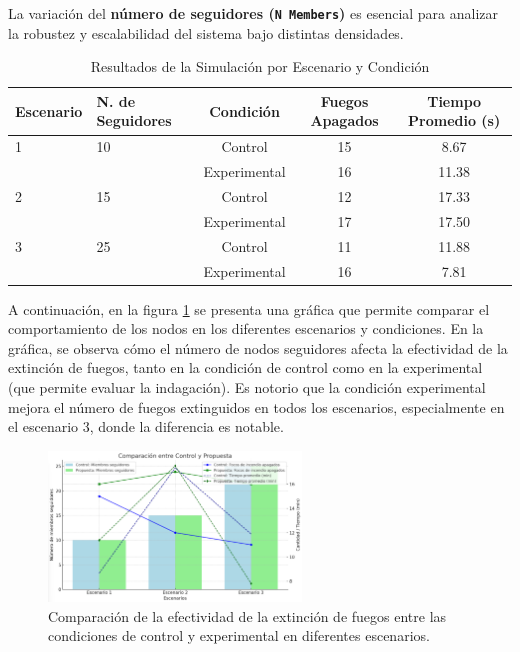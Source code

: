 \documentclass{article}
\begin{document}
La variación del \textbf{número de seguidores (\texttt{N Members})} es esencial para analizar la robustez y escalabilidad del sistema bajo distintas densidades.

\begin{table}[H]
\centering
\caption{Resultados de la Simulación por Escenario y Condición}
\label{tab:results}
\begin{tabular}{llccc}
\toprule
\textbf{Escenario} & \textbf{N. de Seguidores} & \textbf{Condición} & \textbf{Fuegos Apagados} & \textbf{Tiempo Promedio (s)} \\
\midrule
1 & 10 & Control      & 15 & 8.67  \\
  &    & Experimental & 16 & 11.38 \\
\midrule
2 & 15 & Control      & 12 & 17.33 \\
  &    & Experimental & 17 & 17.50 \\
\midrule
3 & 25 & Control      & 11 & 11.88 \\
  &    & Experimental & 16 & 7.81  \\
\bottomrule
\end{tabular}
\end{table}

A continuación, en la figura \ref{fig:comparison_plot} se presenta una gráfica que permite comparar el comportamiento de los nodos en los diferentes escenarios y condiciones. 
En la gráfica, se observa cómo el número de nodos seguidores afecta la efectividad de la extinción de fuegos, tanto en la condición de control como en la experimental (que permite evaluar la indagación). Es notorio que la condición experimental mejora el número de fuegos extinguidos en todos los escenarios, especialmente en el escenario 3, donde la diferencia es notable.
\begin{figure}[H]
    \centering
    \includegraphics[width=0.6\textwidth]{comparativeExperiments.png}
    \caption{Comparación de la efectividad de la extinción de fuegos entre las condiciones de control y experimental en diferentes escenarios.}
    \label{fig:comparison_plot}
\end{figure}
\end{document}
